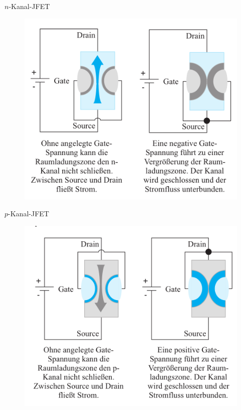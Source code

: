\documentclass[12pt%
,aspectratio=169%
]{beamer}
\begin{document}
\begin{frame}{$n$-Kanal-JFET}
\begin{figure}
\center
\includegraphics[scale=0.4]{pictures/n_jfet}
\end{figure}
\end{frame}

\begin{frame}{$p$-Kanal-JFET}
\begin{figure}
\center
\includegraphics[scale=0.4]{pictures/p_jfet}
\end{figure}
\end{frame}
\end{document}
